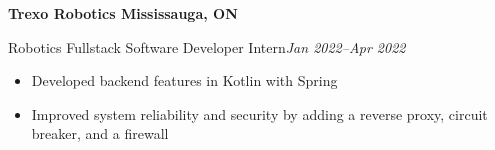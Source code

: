 \textbf{Trexo Robotics \hfill Mississauga, ON}

Robotics Fullstack Software Developer Intern\hfill \textit{Jan 2022--Apr 2022}
\begin{itemize}
    \item Developed backend features in Kotlin with Spring
    \item Improved system reliability and security by adding a reverse proxy, circuit breaker, and a firewall
\end{itemize}
